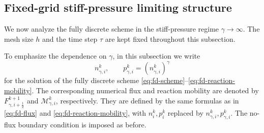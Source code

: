\documentclass[11pt]{article}
\theoremstyle{plain}
\numberwithin{equation}{section}
\begin{document}
\subsection{Fixed-grid stiff-pressure limiting structure}
\label{subsec:large-gamma-structure}
\label{sec:ap}

We now analyze the fully discrete scheme in the stiff-pressure regime
\(\gamma\to\infty\). The mesh size \(h\) and the time step \(\tau\) are kept
fixed throughout this subsection. 


To emphasize the dependence on \(\gamma\), in this subsection we write
\[
    n_{\gamma,i}^k,\qquad
    p_{\gamma,i}^k=(n_{\gamma,i}^k)^\gamma
\]
for the solution of the fully discrete scheme
\eqref{eq:fd-scheme}--\eqref{eq:fd-reaction-mobility}. The corresponding
numerical flux and reaction mobility are denoted by
\(F_{\gamma, i+\frac12}^{k+1}\) and \(\mathcal M_{\gamma,i}^k\), respectively. 
They are defined by the same formulas as in \eqref{eq:fd-flux} and
\eqref{eq:fd-reaction-mobility}, with \(n_i^k,p_i^k\) replaced by
\(n_{\gamma,i}^k,p_{\gamma,i}^k\). The no-flux boundary condition is imposed as
before.
\end{document}
